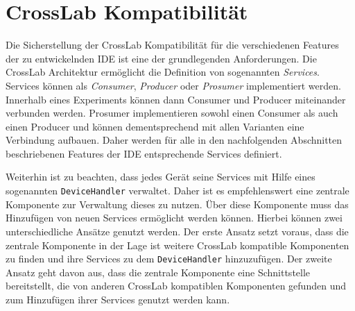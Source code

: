 \section{CrossLab Kompatibilität}\label{section:konzeption:crosslab-kompatibilität}

Die Sicherstellung der CrossLab Kompatibilität für die verschiedenen Features der zu entwickelnden IDE ist eine der grundlegenden Anforderungen. Die CrossLab Architektur ermöglicht die Definition von sogenannten \emph{Services}. Services können als \emph{Consumer}, \emph{Producer} oder \emph{Prosumer} implementiert werden. Innerhalb eines Experiments können dann Consumer und Producer miteinander verbunden werden. Prosumer implementieren sowohl einen Consumer als auch einen Producer und können dementsprechend mit allen Varianten eine Verbindung aufbauen. Daher werden für alle in den nachfolgenden Abschnitten beschriebenen Features der IDE entsprechende Services definiert.

Weiterhin ist zu beachten, dass jedes Gerät seine Services mit Hilfe eines sogenannten \texttt{DeviceHandler} verwaltet. Daher ist es empfehlenswert eine zentrale Komponente zur Verwaltung dieses zu nutzen. Über diese Komponente muss das Hinzufügen von neuen Services ermöglicht werden können. Hierbei können zwei unterschiedliche Ansätze genutzt werden. Der erste Ansatz setzt voraus, dass die zentrale Komponente in der Lage ist weitere CrossLab kompatible Komponenten zu finden und ihre Services zu dem \texttt{DeviceHandler} hinzuzufügen. Der zweite Ansatz geht davon aus, dass die zentrale Komponente eine Schnittstelle bereitstellt, die von anderen CrossLab kompatiblen Komponenten gefunden und zum Hinzufügen ihrer Services genutzt werden kann.